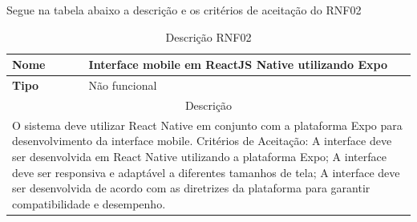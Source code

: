 \clearpage
Segue na tabela abaixo a descrição e os critérios de aceitação do RNF02
\begin{table}[htb]
	\centering
	\caption{\label{Formatação do texto.}Descrição RNF02}	
	\begin{tabular}{|l|p{11cm}|}
		\hline
		\textbf{Nome}    & Interface mobile em ReactJS Native utilizando Expo\\ \hline
		\textbf{Tipo}    & Não funcional\\ \hline
		\multicolumn{2}{|c|}{Descrição}\\ \hline
		\multicolumn{2}{|p{12cm}|}{
			O sistema deve utilizar React Native em conjunto com a plataforma Expo para desenvolvimento da interface mobile. \newline
			\newline Critérios de Aceitação: \newline
			A interface deve ser desenvolvida em React Native utilizando a plataforma Expo; \newline
			\newline A interface deve ser responsiva e adaptável a diferentes tamanhos de tela;\newline
			\newline A interface deve ser desenvolvida de acordo com as diretrizes da plataforma para garantir compatibilidade e desempenho.
			} \\ \hline
	\end{tabular}
\end{table}

